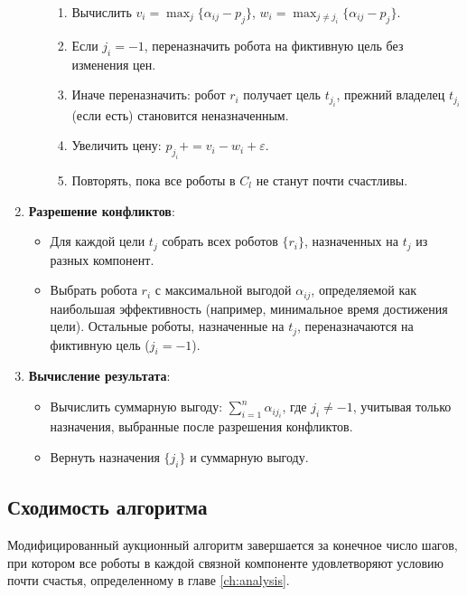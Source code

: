 \begin{enumerate}
\begin{itemize}
\begin{enumerate}
            \item Вычислить \( v_i = \max_j \{\alpha_{ij} - p_j\} \), \( w_i = \max_{j \neq j_i} \{\alpha_{ij} - p_j\} \).
            \item Если \( j_i = -1 \), переназначить робота на фиктивную цель без изменения цен.
            \item Иначе переназначить: робот \( r_i \) получает цель \( t_{j_i} \), прежний владелец \( t_{j_i} \) (если есть) становится неназначенным.
            \item Увеличить цену: \( p_{j_i} += v_i - w_i + \varepsilon \).
            \item Повторять, пока все роботы в \( C_l \) не станут почти счастливы.
        \end{enumerate}
    \end{itemize}
    \item \textbf{Разрешение конфликтов}:
    \begin{itemize}
        \item Для каждой цели \( t_j \) собрать всех роботов \( \{r_i\} \), назначенных на \( t_j \) из разных компонент.
        \item Выбрать робота \( r_i \) с максимальной выгодой \( \alpha_{ij} \), определяемой как наибольшая эффективность (например, минимальное время достижения цели). Остальные роботы, назначенные на \( t_j \), переназначаются на фиктивную цель (\( j_i = -1 \)).
    \end{itemize}
    \item \textbf{Вычисление результата}:
    \begin{itemize}
        \item Вычислить суммарную выгоду: \( \sum_{i=1}^n \alpha_{i j_i} \), где \( j_i \neq -1 \), учитывая только назначения, выбранные после разрешения конфликтов.
        \item Вернуть назначения \( \{j_i\} \) и суммарную выгоду.
    \end{itemize}
\end{enumerate}

\subsection{Сходимость алгоритма}

\begin{theorem}
\label{thm:mod_auction_convergence}
Модифицированный аукционный алгоритм завершается за конечное число шагов, при котором все роботы в каждой связной компоненте удовлетворяют условию почти счастья, определенному в главе \ref{ch:analysis}.
\end{theorem}

